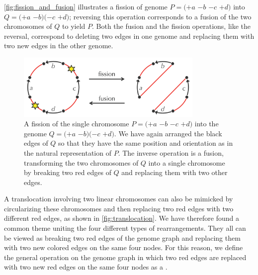 \autoref{fig:fission_and_fusion} illustrates a fission of genome $P=(+a$ $-b$ $-c$ $+d)$ into $Q = (+a$ $-b) (-c$ $+d)$; reversing this operation corresponds to a fusion of the two chromosomes of $Q$ to yield $P$. Both the fusion and the fission operations, like the reversal, correspond to deleting two edges in one genome and replacing them with two new edges in the other genome.

\begin{figure}[h]
\mySfFamily
\centering
\includegraphics[width = 0.8\textwidth]{images/rearrangements/fission_and_fusion}
\caption{A fission of the single chromosome $P = (+a$ $-b$ $-c$ $+d)$ into the genome $Q = (+a$ $-b)(-c$ $+d)$.  We have again arranged the black edges of $Q$ so that they have the same position and orientation as in the natural representation of $P$.  The inverse operation is a fusion, transforming the two chromosomes of $Q$ into a single chromosome by breaking two red edges of $Q$ and replacing them with two other edges.}
\label{fig:fission_and_fusion}
\end{figure}

A translocation involving two linear chromosomes can also be mimicked by circularizing these chromosomes and then replacing two red edges with two different red edges, as shown in \autoref{fig:translocation}. We have therefore found a common theme uniting the four different types of rearrangements. They all can be viewed as breaking two red edges of the genome graph and replacing them with two new colored edges on the same four nodes.  For this reason, we define the general operation on the genome graph in which two red edges are replaced with two new red edges on the same four nodes as a .

